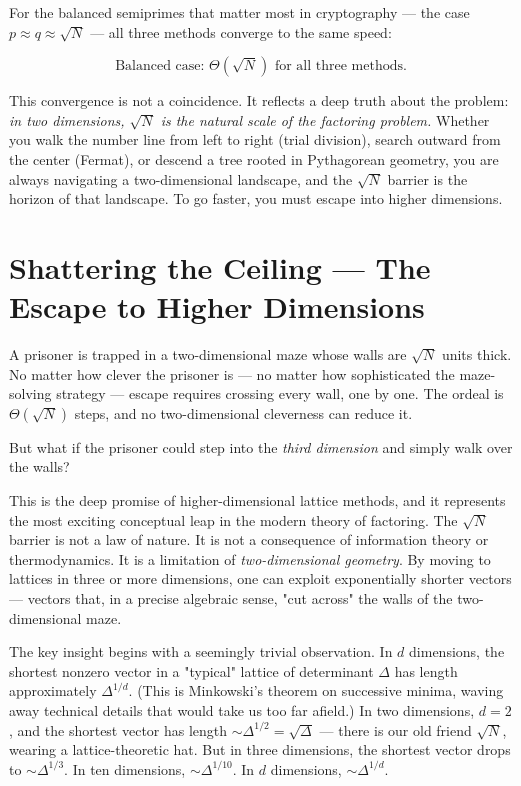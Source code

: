 \documentclass[11pt,twoside,openright]{book}
\theoremstyle{definition}
\theoremstyle{remark}
\begin{document}
For the balanced semiprimes that matter most in cryptography --- the case $p \approx q \approx \sqrt{N}$ --- all three methods converge to the same speed:

\[\text{Balanced case: } \Theta(\sqrt{N}) \text{ for all three methods.}\]

This convergence is not a coincidence. It reflects a deep truth about the problem: \textit{in two dimensions, $\sqrt{N}$ is the natural scale of the factoring problem.} Whether you walk the number line from left to right (trial division), search outward from the center (Fermat), or descend a tree rooted in Pythagorean geometry, you are always navigating a two-dimensional landscape, and the $\sqrt{N}$ barrier is the horizon of that landscape. To go faster, you must escape into higher dimensions.




\section{Shattering the Ceiling --- The Escape to Higher Dimensions}

A prisoner is trapped in a two-dimensional maze whose walls are $\sqrt{N}$ units thick. No matter how clever the prisoner is --- no matter how sophisticated the maze-solving strategy --- escape requires crossing every wall, one by one. The ordeal is $\Theta(\sqrt{N})$ steps, and no two-dimensional cleverness can reduce it.

But what if the prisoner could step into the \textit{third dimension} and simply walk over the walls?

This is the deep promise of higher-dimensional lattice methods, and it represents the most exciting conceptual leap in the modern theory of factoring. The $\sqrt{N}$ barrier is not a law of nature. It is not a consequence of information theory or thermodynamics. It is a limitation of \textit{two-dimensional geometry}. By moving to lattices in three or more dimensions, one can exploit exponentially shorter vectors --- vectors that, in a precise algebraic sense, "cut across" the walls of the two-dimensional maze.

The key insight begins with a seemingly trivial observation. In $d$ dimensions, the shortest nonzero vector in a "typical" lattice of determinant $\Delta$ has length approximately $\Delta^{1/d}$. (This is Minkowski's theorem on successive minima, waving away technical details that would take us too far afield.) In two dimensions, $d = 2$, and the shortest vector has length $\sim \Delta^{1/2} = \sqrt{\Delta}$ --- there is our old friend $\sqrt{N}$, wearing a lattice-theoretic hat. But in three dimensions, the shortest vector drops to $\sim \Delta^{1/3}$. In ten dimensions, $\sim \Delta^{1/10}$. In $d$ dimensions, $\sim \Delta^{1/d}$.
\end{document}
